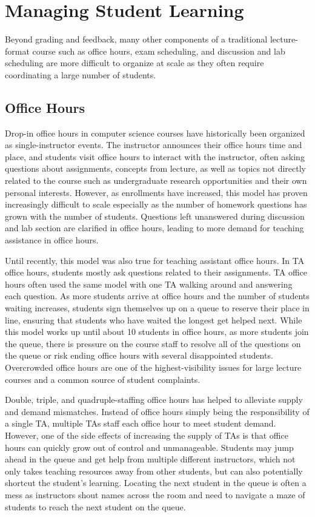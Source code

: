 \section{Managing Student Learning}

Beyond grading and feedback, many other components of a traditional lecture-format course such as office hours, exam scheduling, and discussion and lab scheduling are more difficult to organize at scale as they often require coordinating a large number of students.

\subsection{Office Hours}

Drop-in office hours in computer science courses have historically been organized as single-instructor events. The instructor announces their office hours time and place, and students visit office hours to interact with the instructor, often asking questions about assignments, concepts from lecture, as well as topics not directly related to the course such as undergraduate research opportunities and their own personal interests. However, as enrollments have increased, this model has proven increasingly difficult to scale especially as the number of homework questions has grown with the number of students. Questions left unanswered during discussion and lab section are clarified in office hours, leading to more demand for teaching assistance in office hours.

Until recently, this model was also true for teaching assistant office hours. In TA office hours, students mostly ask questions related to their assignments. TA office hours often used the same model with one TA walking around and answering each question. As more students arrive at office hours and the number of students waiting increases, students sign themselves up on a queue to reserve their place in line, ensuring that students who have waited the longest get helped next. While this model works up until about 10 students in office hours, as more students join the queue, there is pressure on the course staff to resolve all of the questions on the queue or risk ending office hours with several disappointed students. Overcrowded office hours are one of the highest-visibility issues for large lecture courses and a common source of student complaints.

Double, triple, and quadruple-staffing office hours has helped to alleviate supply and demand mismatches. Instead of office hours simply being the responsibility of a single TA, multiple TAs staff each office hour to meet student demand. However, one of the side effects of increasing the supply of TAs is that office hours can quickly grow out of control and unmanageable.  Students may jump ahead in the queue and get help from multiple different instructors, which not only takes teaching resources away from other students, but can also potentially shortcut the student's learning. Locating the next student in the queue is often a mess as instructors shout names across the room and need to navigate a maze of students to reach the next student on the queue.

